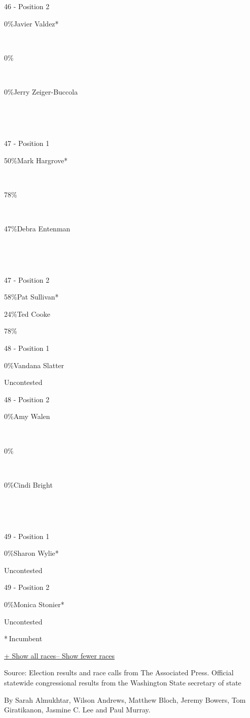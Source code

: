 ~

~

46 - Position 2

 0\%Javier Valdez*

~

0\%

~

 0\%Jerry Zeiger-Buccola

~

~

47 - Position 1

 50\%Mark Hargrove*

~

78\%

~

 47\%Debra Entenman

~

~

47 - Position 2

 58\%Pat Sullivan*

 24\%Ted Cooke

78\%

48 - Position 1

 0\%Vandana Slatter

Uncontested

48 - Position 2

 0\%Amy Walen

~

0\%

~

 0\%Cindi Bright

~

~

49 - Position 1

 0\%Sharon Wylie*

Uncontested

49 - Position 2

 0\%Monica Stonier*

Uncontested

* Incumbent~

\protect\hyperlink{}{+ Show all races-- Show fewer races}

Source: Election results and race calls from The Associated Press.
Official statewide congressional results from the Washington State
secretary of state

By Sarah Almukhtar, Wilson Andrews, Matthew Bloch, Jeremy Bowers, Tom
Giratikanon, Jasmine C. Lee and Paul Murray.

